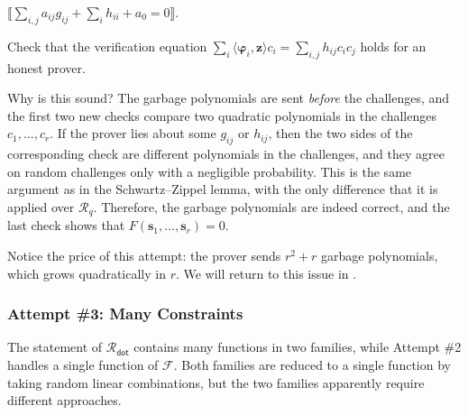 \documentclass[../../book.tex]{subfiles}
\begin{document}
\begin{algoproto}[ht]
\begin{mdframed}[linecolor=black, linewidth=1pt,
                     skipabove=10pt, skipbelow=10pt,
                     innerleftmargin=5pt, innerrightmargin=5pt]
\begin{minipage}[t]{0.54\linewidth}
\begin{algoen}
                \item {} \colorbox{oc-orange-1}{$\llbracket \sum_{i,j} a_{ij}g_{ij} + \sum_{i} h_{ii} + a_0 = 0 \rrbracket$}.
            \end{algoen}
        \end{minipage}
    \end{mdframed}
    \caption{Attempt \#2: amortized opening together with a proof of a single dot product constraint $F(\mathbf{s}_1, \dots, \mathbf{s}_r) = 0$. Here, $g_{ji} := g_{ij}$ and $h_{ji} := h_{ij}$. Changes compared to  are highlighted.}
    \label{fig:labrador-attempt-2}
\end{algoproto}

\begin{exercise}\label{exercise:labrador-garbage}
    Check that the verification equation $\sum_{i} \langle \boldsymbol{\varphi}_i, \mathbf{z} \rangle c_i = \sum_{i,j} h_{ij}c_ic_j$ holds for an honest prover.
\end{exercise}

Why is this sound?
The garbage polynomials are sent \emph{before} the challenges, and the first two new checks compare two quadratic polynomials in the challenges $c_1, \dots, c_r$.
If the prover lies about some $g_{ij}$ or $h_{ij}$, then the two sides of the corresponding check are different polynomials in the challenges, and they agree on random challenges only with a negligible probability.
This is the same argument as in the Schwartz--Zippel lemma, with the only difference that it is applied over $\mathcal{R}_q$.
Therefore, the garbage polynomials are indeed correct, and the last check shows that $F(\mathbf{s}_1, \dots, \mathbf{s}_r) = 0$.

Notice the price of this attempt: the prover sends $r^2 + r$ garbage polynomials, which grows quadratically in $r$.
We will return to this issue in .

\subsubsection{Attempt \#3: Many Constraints}

The statement of $\mathcal{R}_{\mathsf{dot}}$ contains many functions in two families, while Attempt \#2 handles a single function of $\mathcal{F}$.
Both families are reduced to a single function by taking random linear combinations, but the two families apparently require different approaches.
\end{document}
